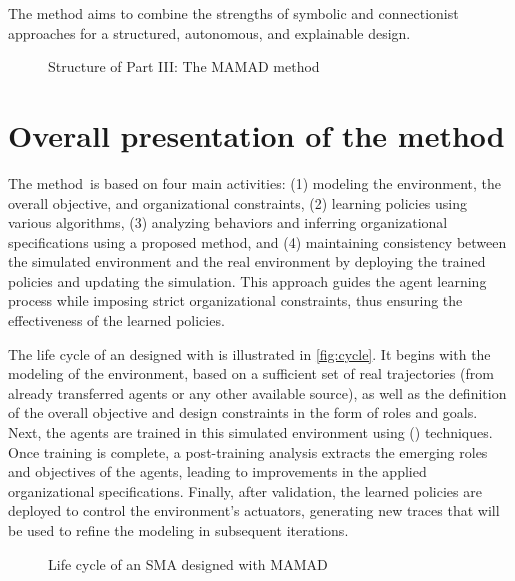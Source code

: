 The  method aims to combine the strengths of symbolic and connectionist approaches for a structured, autonomous, and explainable  design.

\begin{figure}[h!]
  \centering
  \resizebox{0.7\linewidth}{!}{%
    
  }
  \caption{Structure of Part III: The MAMAD method}
  \label{fig:organization_manuscript_part_3}
\end{figure}



\clearpage
\thispagestyle{empty}
\null
\newpage

\chapter{Overall presentation of the method}
\label{chap:mamad_global}

The  method~\footnotemark[2] is based on four main activities: (1) modeling the environment, the overall objective, and organizational constraints, (2) learning policies using various  algorithms, (3) analyzing behaviors and inferring organizational specifications using a proposed method, and (4) maintaining consistency between the simulated environment and the real environment by deploying the trained policies and updating the simulation. This approach guides the agent learning process while imposing strict organizational constraints, thus ensuring the effectiveness of the learned policies.

The life cycle of an  designed with  is illustrated in \autoref{fig:cycle}. It begins with the modeling of the environment, based on a sufficient set of real trajectories (from already transferred agents or any other available source), as well as the definition of the overall objective and design constraints in the form of roles and goals. Next, the agents are trained in this simulated environment using  () techniques. Once training is complete, a post-training analysis extracts the emerging roles and objectives of the agents, leading to improvements in the applied organizational specifications. Finally, after validation, the learned policies are deployed to control the environment's actuators, generating new traces that will be used to refine the modeling in subsequent iterations.

\begin{figure}[h!]
  \centering
  
  \caption{Life cycle of an SMA designed with MAMAD}
  \label{fig:cycle}
\end{figure}

